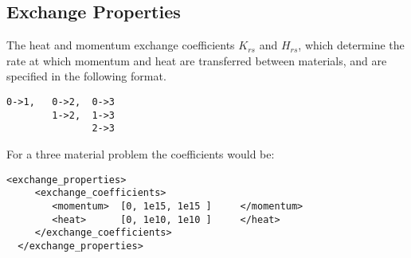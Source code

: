 \subsection{Exchange Properties}
The heat and momentum exchange coefficients $K_{rs}$ and $H_{rs}$, which determine the rate at which momentum and heat are transferred between materials, and are specified in the following format.
%
\begin{Verbatim}[fontsize=\footnotesize]
0->1,   0->2,  0->3
        1->2,  1->3
               2->3
\end{Verbatim}
%
For a three material problem the coefficients would be:
%
\begin{Verbatim}[fontsize=\footnotesize]
  <exchange_properties> 
     <exchange_coefficients>
        <momentum>  [0, 1e15, 1e15 ]     </momentum>
        <heat>      [0, 1e10, 1e10 ]     </heat>  
     </exchange_coefficients>
  </exchange_properties>
\end{Verbatim}
%
%

